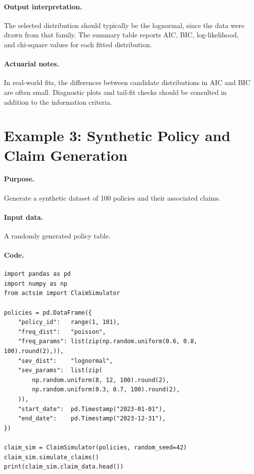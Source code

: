 \paragraph{Output interpretation.} The selected distribution should
typically be the lognormal, since the data were drawn from that family.
The summary table reports AIC, BIC, log-likelihood, and chi-square
values for each fitted distribution.

\paragraph{Actuarial notes.} In real-world fits, the differences between
candidate distributions in AIC and BIC are often small. Diagnostic plots
and tail-fit checks should be consulted in addition to the
information criteria.

\section{Example 3: Synthetic Policy and Claim Generation}

\paragraph{Purpose.} Generate a synthetic dataset of 100 policies and
their associated claims.

\paragraph{Input data.} A randomly generated policy table.

\paragraph{Code.}
\begin{lstlisting}[style=pythonstyle]
import pandas as pd
import numpy as np
from actsim import ClaimSimulator

policies = pd.DataFrame({
    "policy_id":   range(1, 101),
    "freq_dist":   "poisson",
    "freq_params": list(zip(np.random.uniform(0.6, 0.8, 100).round(2),)),
    "sev_dist":    "lognormal",
    "sev_params":  list(zip(
        np.random.uniform(8, 12, 100).round(2),
        np.random.uniform(0.3, 0.7, 100).round(2),
    )),
    "start_date":  pd.Timestamp("2023-01-01"),
    "end_date":    pd.Timestamp("2023-12-31"),
})

claim_sim = ClaimSimulator(policies, random_seed=42)
claim_sim.simulate_claims()
print(claim_sim.claim_data.head())
\end{lstlisting}

